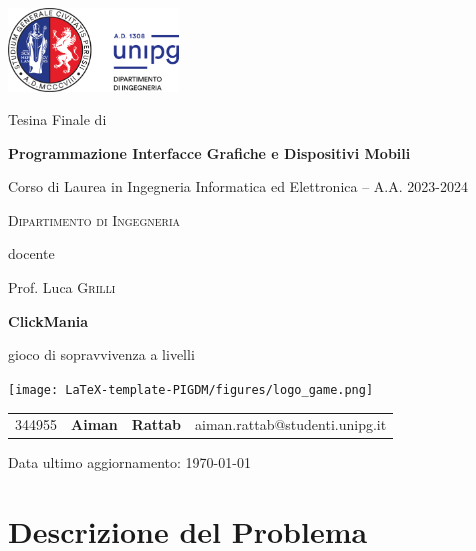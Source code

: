 \documentclass[12pt,a4paper]{report}
\begin{document}
\begin{titlepage}
	\centering
	\includegraphics[width=0.34\textwidth]{logo-unipg}\par\vspace{1cm}
	\large{Tesina Finale di}\par
	\large{\textbf{Programmazione Interfacce Grafiche e Dispositivi Mobili}}\par
	\small{Corso di Laurea in Ingegneria Informatica ed Elettronica -- A.A. 2023-2024}\par
	\textsc{\small{Dipartimento di Ingegneria}}\par

	\vspace{0.5cm}
	docente\par
	Prof. Luca \textsc{Grilli}

	\vspace{1cm}
	\vspace{1cm}
	\textbf{\huge{ClickMania}}\par
	\vspace{0.2cm}
	gioco di sopravvivenza a livelli\par
	\vspace{0.5cm}
	\texttt{[image: LaTeX-template-PIGDM/figures/logo\_game.png]}\par\vspace{1cm}
	\vspace{1cm}

	\begin{tabular}{ l l l l }
	\large{344955} & \large{\textbf{Aiman}} & \large{\textbf{Rattab}} & \large{aiman.rattab@studenti.unipg.it}\\
	\end{tabular}

	\vfill
	\raggedright
	\small{Data ultimo aggiornamento: \today}
\end{titlepage}

\restoregeometry
\tableofcontents

\chapter{Descrizione del Problema}\label{ch:despro}
\end{document}
